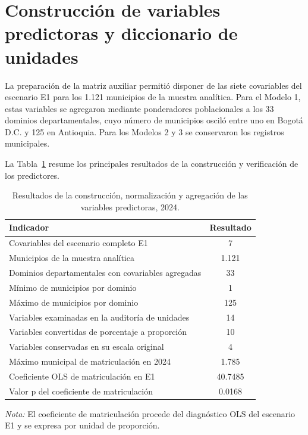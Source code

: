 
\section{Construcción de variables predictoras y diccionario de unidades}
\label{sec:res-predictoras}

La preparación de la matriz auxiliar permitió disponer de las siete covariables del escenario E1 para los 1.121 municipios de la muestra analítica. Para el Modelo 1, estas variables se agregaron mediante ponderadores poblacionales a los 33 dominios departamentales, cuyo número de municipios osciló entre uno en Bogotá D.C. y 125 en Antioquia. Para los Modelos 2 y 3 se conservaron los registros municipales.

La Tabla~\ref{tab:resultados_predictoras} resume los principales resultados de la construcción y verificación de los predictores.

\begin{table}[!htbp]
\centering
\footnotesize
\caption{Resultados de la construcción, normalización y agregación de las variables predictoras, 2024.}
\label{tab:resultados_predictoras}
\renewcommand{\arraystretch}{1.2}
\setlength{\tabcolsep}{6pt}
\begin{tabular}{p{7.2cm} c}
\hline
Indicador & Resultado \\
\hline
Covariables del escenario completo E1 & 7 \\
Municipios de la muestra analítica & 1.121 \\
Dominios departamentales con covariables agregadas & 33 \\
Mínimo de municipios por dominio & 1 \\
Máximo de municipios por dominio & 125 \\
Variables examinadas en la auditoría de unidades & 14 \\
Variables convertidas de porcentaje a proporción & 10 \\
Variables conservadas en su escala original & 4 \\
Máximo municipal de matriculación en 2024 & 1.785 \\
Coeficiente OLS de matriculación en E1 & 40.7485 \\
Valor p del coeficiente de matriculación & 0.0168 \\
\hline
\end{tabular}

\vspace{2mm}
\begin{minipage}{0.92\textwidth}
\footnotesize
\textit{Nota:} El coeficiente de matriculación procede del diagnóstico OLS del escenario E1 y se expresa por unidad de proporción.
\end{minipage}
\end{table}

